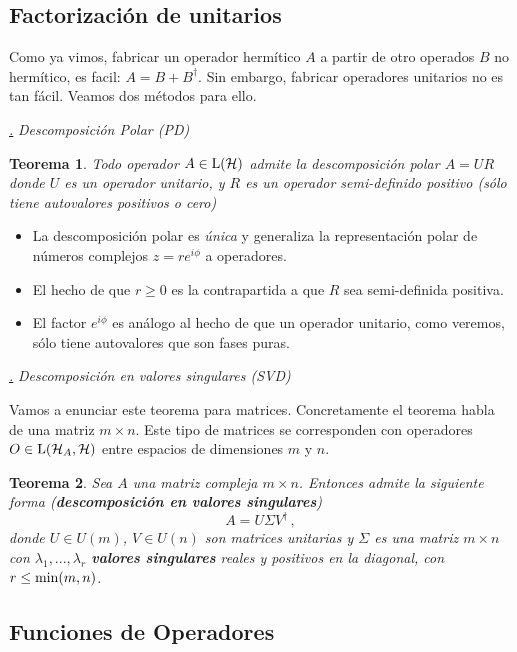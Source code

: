 \documentclass[a4paper,11pt]{book} %
\newtheorem{teorema_contador}{Teorema}
\newcommand{\Teorema}[1]{
		\begin{mybox_gray2}{}
			\begin{teorema_contador}
				 #1 
			\end{teorema_contador} 
		\end{mybox_gray2}
	}
\numberwithin{equation}{chapter}
\def\subsubiContadorIt{\par\addtocounter{subsubsection}{1}\underline{\it\thesubsubsection.}\hskip0.5cm \setcounter{subsubsubsectionIt}{0}}
\newcommand{\SubsubiIt}[1]{
		\subsubiContadorIt \textit{#1}
	}
\newcounter{subsubsubsectionIt}[subsubsection]
\begin{document}
		\subsection{Factorización de unitarios}
		
Como ya vimos, fabricar un operador hermítico $A$ a partir de otro operados $B$ no hermítico, es facil:
$A = B + B^\dagger$. Sin embargo, fabricar operadores unitarios no es tan fácil. Veamos dos métodos para ello.


			\SubsubiIt{Descomposición Polar (PD)}

	\Teorema{
	Todo operador $A\in{\rm L}(\mathcal{H})$ admite la descomposición polar $A = UR$ donde $U$ es un operador unitario, y $R$ es un operador semi-definido positivo (sólo tiene autovalores positivos o cero)
	}

\begin{itemize}
	\item La descomposición polar es \textit{única} y generaliza la representación polar de números complejos $z = r e^{i\phi}$ a operadores.
	\item El hecho de que $r\geq 0$ es la contrapartida a que $R$ sea semi-definida positiva. 
	\item El factor $e^{i\phi}$ es análogo al hecho de que un operador unitario, como veremos, sólo tiene autovalores que son fases puras.
\end{itemize}


			\SubsubiIt{Descomposición en valores singulares (SVD)}

Vamos a enunciar este teorema para matrices. Concretamente el teorema habla de una matriz $m\times n$. Este tipo de matrices se corresponden con operadores $O \in{\rm L}(\mathcal{H}_A,\mathcal{H})$ entre espacios de dimensiones $m$ y $n$.

	\Teorema{
	Sea $A$ una matriz compleja $m\times n$. Entonces  admite la siguiente forma (\textbf{descomposición en valores singulares})
	\begin{equation}
	A = U\Sigma V^{\dagger} \, ,
	\end{equation}
	donde $U\in U(m)$, $V\in U(n)$ son matrices unitarias y $\Sigma$ es una matriz  $m\times n$ con $\lambda_1, ...,\lambda_r$ \textbf{valores singulares} reales y positivos en la diagonal, con $r\leq {\rm min}(m,n)$. 
	}



		\subsection{Funciones de Operadores}
		
\end{document}
